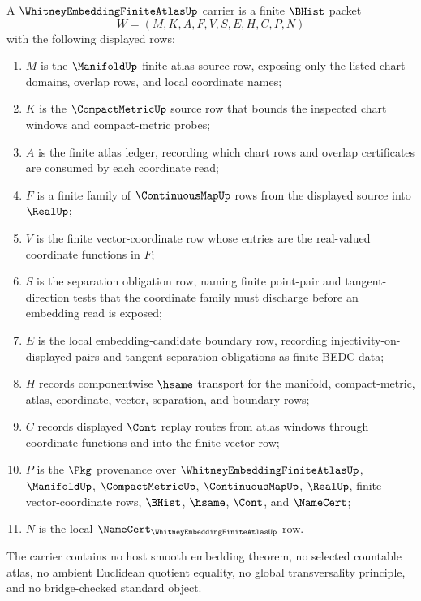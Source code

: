 \begin{definition}
\label{def:whitney-embedding-finite-atlas-carrier}
A $\WhitneyEmbeddingFiniteAtlasUp$ carrier is a finite $\BHist$ packet
$$
W=(M,K,A,F,V,S,E,H,C,P,N)
$$
with the following displayed rows:
\begin{enumerate}
\item $M$ is the $\ManifoldUp$ finite-atlas source row, exposing only the listed chart domains, overlap rows, and local coordinate names;
\item $K$ is the $\CompactMetricUp$ source row that bounds the inspected chart windows and compact-metric probes;
\item $A$ is the finite atlas ledger, recording which chart rows and overlap certificates are consumed by each coordinate read;
\item $F$ is a finite family of $\ContinuousMapUp$ rows from the displayed source into $\RealUp$;
\item $V$ is the finite vector-coordinate row whose entries are the real-valued coordinate functions in $F$;
\item $S$ is the separation obligation row, naming finite point-pair and tangent-direction tests that the coordinate family must discharge before an embedding read is exposed;
\item $E$ is the local embedding-candidate boundary row, recording injectivity-on-displayed-pairs and tangent-separation obligations as finite BEDC data;
\item $H$ records componentwise $\hsame$ transport for the manifold, compact-metric, atlas, coordinate, vector, separation, and boundary rows;
\item $C$ records displayed $\Cont$ replay routes from atlas windows through coordinate functions and into the finite vector row;
\item $P$ is the $\Pkg$ provenance over $\WhitneyEmbeddingFiniteAtlasUp$, $\ManifoldUp$, $\CompactMetricUp$, $\ContinuousMapUp$, $\RealUp$, finite vector-coordinate rows, $\BHist$, $\hsame$, $\Cont$, and $\NameCert$;
\item $N$ is the local $\NameCert_{\WhitneyEmbeddingFiniteAtlasUp}$ row.
\end{enumerate}
The carrier contains no host smooth embedding theorem, no selected countable atlas, no ambient Euclidean quotient equality, no global transversality principle, and no bridge-checked standard object.
\end{definition}

